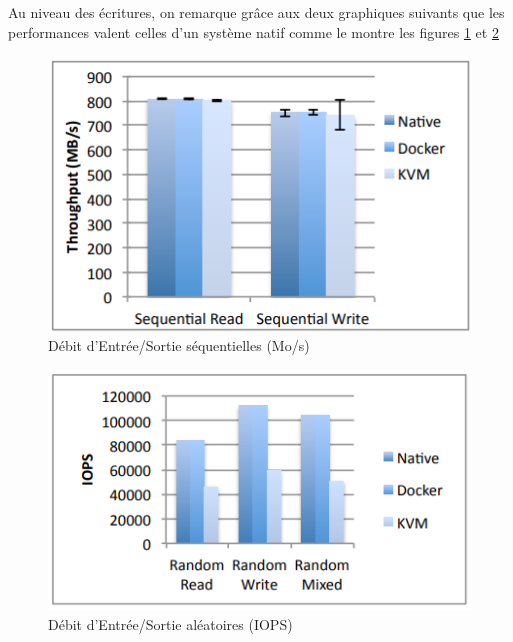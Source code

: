 \documentclass[
    iai, %
    il, %
]{heig-tb}
\begin{document}
Au niveau des écritures, on remarque grâce aux deux graphiques suivants que les performances valent
celles d'un système natif comme le montre les figures \ref{sequential-io} et \ref{random-io}

\begin{center}
    \begin{figure}
        \includegraphics[width=\textwidth]{./assets/figures/docker-perf-sequential-io.png}
        \caption[Docker débit d'I/O séquentielles]{Débit d'Entrée/Sortie séquentielles (Mo/s) \cite{rad2017introduction} \label{sequential-io}}
    \end{figure}
\end{center}

\begin{center}
    \begin{figure}
        \includegraphics[width=\textwidth]{./assets/figures/docker-perf-random-io.png}
        \caption[Débit d'I/O aléatoires]{Débit d'Entrée/Sortie aléatoires (IOPS) \cite{rad2017introduction} \label{random-io}}
    \end{figure}
\end{center}
\end{document}
